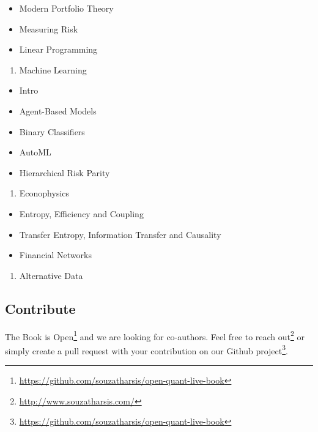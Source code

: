 \documentclass[]{book}
\DeclareRobustCommand{\href}[2]{#2\footnote{\url{#1}}}
\providecommand{\tightlist}{%
  \setlength{\itemsep}{0pt}\setlength{\parskip}{0pt}}
\theoremstyle{definition}
\theoremstyle{definition}
\theoremstyle{definition}
\theoremstyle{remark}
\begin{document}
\begin{itemize}
\tightlist
\item
  Modern Portfolio Theory
\item
  Measuring Risk
\item
  Linear Programming
\end{itemize}

\begin{enumerate}
\def\labelenumi{\arabic{enumi}.}
\setcounter{enumi}{3}
\tightlist
\item
  Machine Learning
\end{enumerate}

\begin{itemize}
\tightlist
\item
  Intro
\item
  Agent-Based Models
\item
  Binary Classifiers
\item
  AutoML
\item
  Hierarchical Risk Parity
\end{itemize}

\begin{enumerate}
\def\labelenumi{\arabic{enumi}.}
\setcounter{enumi}{4}
\tightlist
\item
  Econophysics
\end{enumerate}

\begin{itemize}
\tightlist
\item
  Entropy, Efficiency and Coupling
\item
  Transfer Entropy, Information Transfer and Causality
\item
  Financial Networks
\end{itemize}

\begin{enumerate}
\def\labelenumi{\arabic{enumi}.}
\setcounter{enumi}{5}
\tightlist
\item
  Alternative Data
\end{enumerate}

\subsection*{Contribute}\label{contribute}


The Book is
\href{https://github.com/souzatharsis/open-quant-live-book}{Open} and we
are looking for co-authors. Feel free to
\href{http://www.souzatharsis.com/}{reach out} or simply create a pull
request with your contribution on our
\href{https://github.com/souzatharsis/open-quant-live-book}{Github
project}.
\end{document}

